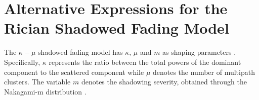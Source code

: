 \begin{table}[]
\centering
\caption{Summary of Important Notations}
\label{table:HBD_UCS_Rician_Shadowed_summary_impt_notations} 
\end{table}

\section{Alternative Expressions for the Rician Shadowed Fading Model} \label{HBD_UCS_Rician_Shadowed_sec_rician_shad}
The $\kappa-\mu$ shadowed fading model has $\kappa$, $\mu$ and $m$ as shaping parameters \cite{chun2017comprehensive}. Specifically, $\kappa$ represents the ratio between the total powers of the dominant component to the scattered component while $\mu$ denotes the number of multipath clusters. The variable $m$ denotes the shadowing severity, obtained through the Nakagami-m distribution \cite{chun2017comprehensive}. 


